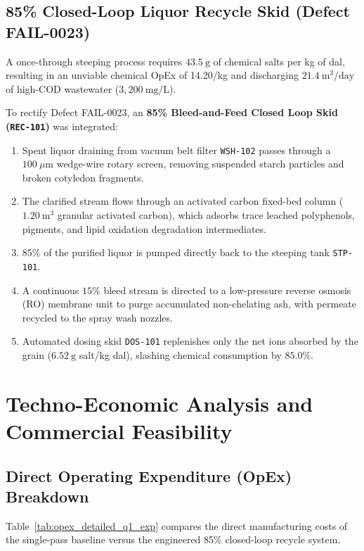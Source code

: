 \documentclass[10pt,a4paper]{article}
\newcommand{\inr}{\text{INR~}}
\begin{document}
\subsection{85\% Closed-Loop Liquor Recycle Skid (Defect FAIL-0023)}
A once-through steeping process requires $43.5\ \mathrm{g}$ of chemical salts per kg of dal, resulting in an unviable chemical OpEx of \inr14.20/kg and discharging $21.4\ \mathrm{m^3/day}$ of high-COD wastewater ($3,200\ \mathrm{mg/L}$).

To rectify Defect FAIL-0023, an \textbf{85\% Bleed-and-Feed Closed Loop Skid (\texttt{REC-101})} was integrated:
\begin{enumerate}[leftmargin=1.5em]
    \item Spent liquor draining from vacuum belt filter \texttt{WSH-102} passes through a $100\ \mu\mathrm{m}$ wedge-wire rotary screen, removing suspended starch particles and broken cotyledon fragments.
    \item The clarified stream flows through an activated carbon fixed-bed column ($1.20\ \mathrm{m}^3$ granular activated carbon), which adsorbs trace leached polyphenols, pigments, and lipid oxidation degradation intermediates.
    \item $85\%$ of the purified liquor is pumped directly back to the steeping tank \texttt{STP-101}.
    \item A continuous $15\%$ bleed stream is directed to a low-pressure reverse osmosis (RO) membrane unit to purge accumulated non-chelating ash, with permeate recycled to the spray wash nozzles.
    \item Automated dosing skid \texttt{DOS-101} replenishes only the net ions absorbed by the grain ($6.52\ \mathrm{g}$ salt/kg dal), slashing chemical consumption by \textbf{$85.0\%$}.
\end{enumerate}


\section{Techno-Economic Analysis and Commercial Feasibility}

\subsection{Direct Operating Expenditure (OpEx) Breakdown}
Table~\ref{tab:opex_detailed_q1_exp} compares the direct manufacturing costs of the single-pass baseline versus the engineered 85\% closed-loop recycle system.
\end{document}
